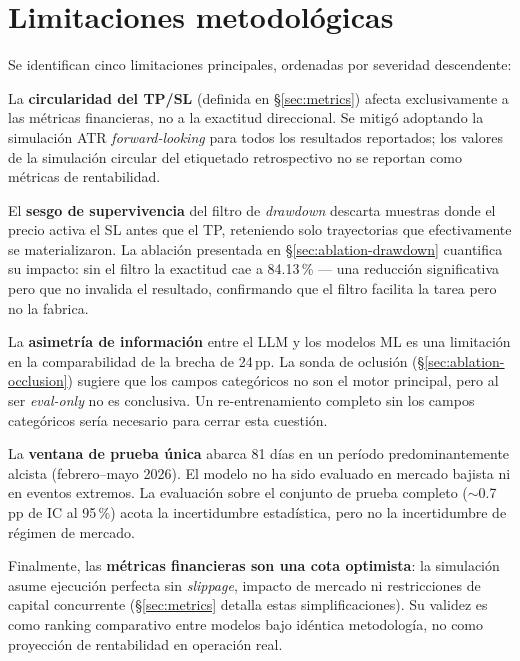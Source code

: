\documentclass[10pt,twocolumn]{article}
\begin{document}
\section{Limitaciones metodol\'ogicas}
\label{sec:limitations}

Se identifican cinco limitaciones principales, ordenadas por severidad descendente:

La \textbf{circularidad del TP/SL} (definida en \S\ref{sec:metrics}) afecta exclusivamente a las m\'etricas financieras, no a la exactitud direccional. Se mitig\'o adoptando la simulaci\'on ATR \textit{forward-looking} para todos los resultados reportados; los valores de la simulaci\'on circular del etiquetado retrospectivo no se reportan como m\'etricas de rentabilidad.

El \textbf{sesgo de supervivencia} del filtro de \textit{drawdown} descarta muestras donde el precio activa el SL antes que el TP, reteniendo solo trayectorias que efectivamente se materializaron. La ablaci\'on presentada en \S\ref{sec:ablation-drawdown} cuantifica su impacto: sin el filtro la exactitud cae a 84.13\,\% --- una reducci\'on significativa pero que no invalida el resultado, confirmando que el filtro facilita la tarea pero no la fabrica.

La \textbf{asimetr\'ia de informaci\'on} entre el LLM y los modelos ML es una limitaci\'on en la comparabilidad de la brecha de 24\,pp. La sonda de oclusi\'on (\S\ref{sec:ablation-occlusion}) sugiere que los campos categ\'oricos no son el motor principal, pero al ser \textit{eval-only} no es conclusiva. Un re-entrenamiento completo sin los campos categ\'oricos ser\'ia necesario para cerrar esta cuesti\'on.

La \textbf{ventana de prueba \'unica} abarca 81 d\'ias en un per\'iodo predominantemente alcista (febrero--mayo 2026). El modelo no ha sido evaluado en mercado bajista ni en eventos extremos. La evaluaci\'on sobre el conjunto de prueba completo ($\sim$0.7\,pp de IC al 95\,\%) acota la incertidumbre estad\'istica, pero no la incertidumbre de r\'egimen de mercado.

Finalmente, las \textbf{m\'etricas financieras son una cota optimista}: la simulaci\'on asume ejecuci\'on perfecta sin \textit{slippage}, impacto de mercado ni restricciones de capital concurrente (\S\ref{sec:metrics} detalla estas simplificaciones). Su validez es como ranking comparativo entre modelos bajo id\'entica metodolog\'ia, no como proyecci\'on de rentabilidad en operaci\'on real.
\end{document}
